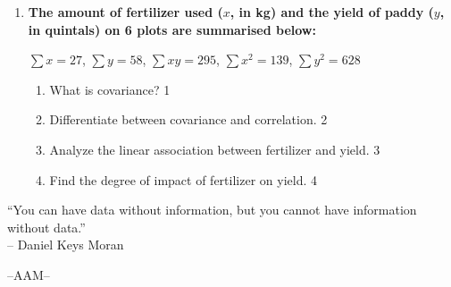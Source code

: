 \documentclass[12pt]{article}
\begin{document}
\begin{enumerate}
\begin{enumerate}
  \item What is kurtosis? \hfill 1
  \item Why are the odd-order central moments of a symmetrical distribution zero? \hfill 2
  \item Find the fourth central moment. \hfill 3
  \item Determine the first and the third raw moments about 50. \hfill 4
\end{enumerate}

\item
\textbf{The amount of fertilizer used ($x$, in kg) and the yield of paddy ($y$, in quintals) on 6 plots are summarised below:}
\begin{center}
$\sum x = 27$, $\sum y = 58$, $\sum xy = 295$, $\sum x^2 = 139$, $\sum y^2 = 628$
\end{center}
\begin{enumerate}
  \item What is covariance? \hfill 1
  \item Differentiate between covariance and correlation. \hfill 2
  \item Analyze the linear association between fertilizer and yield. \hfill 3
  \item Find the degree of impact of fertilizer on yield. \hfill 4
\end{enumerate}

\end{enumerate}

\vspace{1cm}

\begin{center}
``You can have data without information, but you cannot have information without data.''\\
-- Daniel Keys Moran
\end{center}

\vfill

\begin{center}
--AAM--
\end{center}
\end{document}
